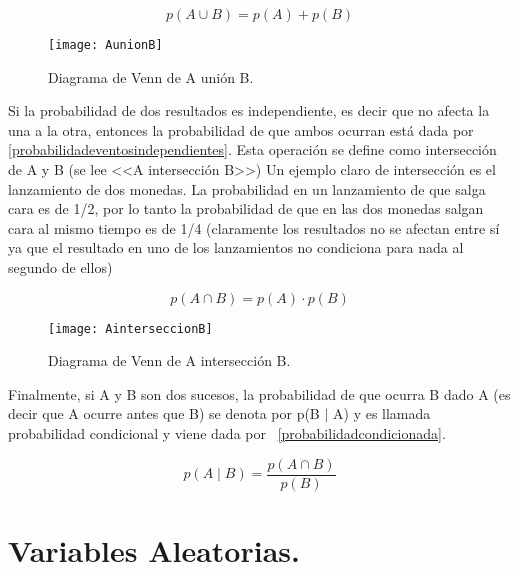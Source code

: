 \begin{equation}\label{probabilidadeventosdependientes}
p(A \cup B) = p(A) + p(B)
\end{equation}

\begin{figure}[H]
\centering
\texttt{[image: AunionB]}
\caption{Diagrama de Venn de A unión B.} \label{AunionB}
\end{figure}

Si la probabilidad de dos resultados es independiente, es decir que no afecta la una a la otra, entonces la probabilidad de que ambos ocurran está dada por \ref{probabilidadeventosindependientes}.
Esta operación se define como intersección de A y B (se lee <<A intersección B>>) Un ejemplo claro de intersección es el lanzamiento de dos monedas.
La probabilidad en un lanzamiento de que salga cara es de 1/2, por lo tanto la probabilidad de que en las dos monedas salgan cara al mismo tiempo es de 1/4 (claramente los resultados no se afectan entre sí ya que el resultado en uno de los lanzamientos no condiciona para nada al segundo de ellos)

\begin{equation}\label{probabilidadeventosindependientes}
p(A \cap B) = p(A) \cdot p(B)
\end{equation}

\begin{figure}[H]
\centering
\texttt{[image: AinterseccionB]}
\caption{Diagrama de Venn de A intersección B.} \label{AinterseccionB}
\end{figure}

Finalmente, si A y B son dos sucesos, la probabilidad de que ocurra B dado A (es decir que A ocurre antes que B) se denota por p(B $\mid$ A) y es llamada probabilidad condicional y viene dada por ~\ref{probabilidadcondicionada}.

\begin{equation}\label{probabilidadcondicionada}
p(A \mid B) = \frac{p(A \cap B)}{p(B)}
\end{equation}

\section{Variables Aleatorias.}

